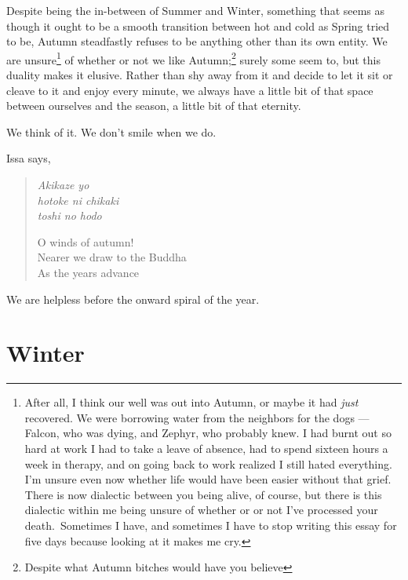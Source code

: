 \documentclass[12pt,oneside]{memoir}
\begin{document}
Despite being the in-between of Summer and Winter, something that seems as though it ought to be a smooth transition between hot and cold as Spring tried to be, Autumn steadfastly refuses to be anything other than its own entity. We are unsure\footnote{After all, I think our well was out into Autumn, or maybe it had \emph{just} recovered. We were borrowing water from the neighbors for the dogs --- Falcon, who was dying, and Zephyr, who probably knew. I had burnt out so hard at work I had to take a leave of absence, had to spend sixteen hours a week in therapy, and on going back to work realized I still hated everything. I'm unsure even now whether life would have been easier without that grief. There is now dialectic between you being alive, of course, but there is this dialectic within me being unsure of whether or or not I've processed your death.\footnotemark\ Sometimes I have, and sometimes I have to stop writing this essay for five days because looking at it makes me cry.} of whether or not we like Autumn;\footnote{Despite what Autumn bitches would have you believe\footnotemark} surely some seem to, but this duality makes it elusive. Rather than shy away from it and decide to let it sit or cleave to it and enjoy every minute, we always have a little bit of that space between ourselves and the season, a little bit of that eternity.

We think of it. We don't smile when we do.

Issa says,

\begin{verse}
\emph{Akikaze yo} \\
\emph{hotoke ni chikaki} \\
\emph{toshi no hodo}

O winds of autumn! \\
Nearer we draw to the Buddha \\
As the years advance

\parencite[11]{issa}
\end{verse}

We are helpless before the onward spiral of the year.


\section*{Winter}
\end{document}
